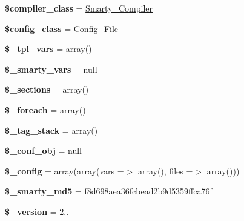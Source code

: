 \begin{DoxyCompactItemize}
{\bfseries \$compiler\+\_\+class} = \textquotesingle{}\mbox{\hyperlink{class_smarty___compiler}{Smarty\+\_\+\+Compiler}}\textquotesingle{}
\item 
\mbox{\label{class_smarty_a1ecdac7cb85b1aea3de21235de5db8d9}} 
{\bfseries \$config\+\_\+class} = \textquotesingle{}\mbox{\hyperlink{class_config___file}{Config\+\_\+\+File}}\textquotesingle{}
\item 
\mbox{\label{class_smarty_ac5b23df7404c26573f1d6efad81b9db9}} 
{\bfseries \$\+\_\+tpl\+\_\+vars} = array()
\item 
\mbox{\label{class_smarty_a8b74cd5266386c9651f86d02b4bf3bc4}} 
{\bfseries \$\+\_\+smarty\+\_\+vars} = null
\item 
\mbox{\label{class_smarty_a873245595639c46ba0a649d9d0abc018}} 
{\bfseries \$\+\_\+sections} = array()
\item 
\mbox{\label{class_smarty_a1c8fbfed4c5eb0d511fe2d98bda8bc19}} 
{\bfseries \$\+\_\+foreach} = array()
\item 
\mbox{\label{class_smarty_a8bc334635a0aa8e117a5e822ca71ee67}} 
{\bfseries \$\+\_\+tag\+\_\+stack} = array()
\item 
\mbox{\label{class_smarty_a6c93acd86cae18c4630b272433b2e543}} 
{\bfseries \$\+\_\+conf\+\_\+obj} = null
\item 
\mbox{\label{class_smarty_a4d4ad4af1600438042f93a4492f8dbbe}} 
{\bfseries \$\+\_\+config} = array(array(\textquotesingle{}vars\textquotesingle{} =$>$ array(), \textquotesingle{}files\textquotesingle{} =$>$ array()))
\item 
\mbox{\label{class_smarty_a215c18c7e01e94ff276e0e7249bfd38d}} 
{\bfseries \$\+\_\+smarty\+\_\+md5} = \textquotesingle{}f8d698aea36fcbead2b9d5359ffca76f\textquotesingle{}
\item 
\mbox{\label{class_smarty_a01caaf3772469caf98e39064bf5d7d8f}} 
{\bfseries \$\+\_\+version} = \textquotesingle{}2..\textquotesingle{}
\item 

\end{DoxyCompactItemize}
